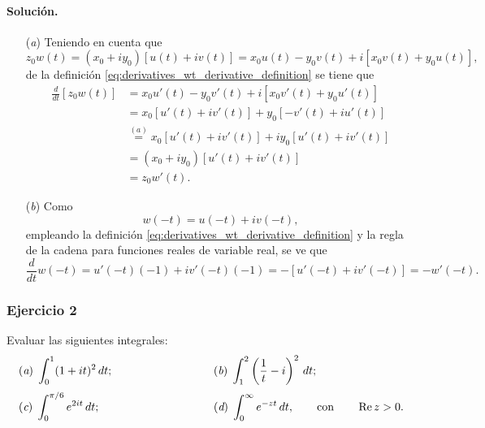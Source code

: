 \documentclass[a4paper]{report}
\renewcommand{\Re}{\operatorname{Re}}
\begin{document}
\paragraph{Solución.}
\begin{enumerate}
 \item[(\textit{a})] Teniendo en cuenta que 
 \[
  z_0w(t)=(x_0+iy_0)[u(t)+iv(t)]=x_0u(t)-y_0v(t)+i[x_0v(t)+y_0u(t)],
 \]
 de la definición \ref{eq:derivatives_wt_derivative_definition} se tiene que 
 \begin{align*}
  \frac{d}{dt}[z_0w(t)]&=x_0u'(t)-y_0v'(t)+i[x_0v'(t)+y_0u'(t)]\\
    &=x_0[u'(t)+iv'(t)]+y_0[-v'(t)+iu'(t)]\\
    &\overset{(a)}{=}x_0[u'(t)+iv'(t)]+iy_0[u'(t)+iv'(t)]\\
    &=(x_0+iy_0)[u'(t)+iv'(t)]\\
    &=z_0w'(t).
 \end{align*}
 \item[(\textit{b})] Como
 \[
  w(-t)=u(-t)+iv(-t),
 \]
 empleando la definición \ref{eq:derivatives_wt_derivative_definition} y la regla de la cadena para funciones reales de variable real, se ve que 
 \[
  \frac{d}{dt}w(-t)=u'(-t)(-1)+iv'(-t)(-1)=-[u'(-t)+iv'(-t)]=-w'(-t).
 \]
\end{enumerate}

\subsubsection{Ejercicio 2}

Evaluar las siguientes integrales:
\[
 \begin{array}{ll}
  (\textit{a})\;\displaystyle\int_0^1(1+it)^2\,dt;\qquad\qquad\qquad\qquad&(\textit{b})\;\displaystyle\int_1^2\left(\frac{1}{t}-i\right)^2\,dt;\\[\bigskipamount]
  (\textit{c})\;\displaystyle\int_0^{\pi/6}e^{2it}\,dt;\qquad\qquad\qquad\qquad&(\textit{d})\;\displaystyle\int_0^\infty e^{-zt}\,dt,\qquad\textrm{con}\qquad\Re z>0.
 \end{array}
\]
\end{document}
